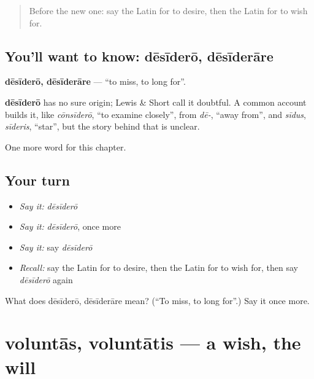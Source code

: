 \label{lesson:LA-C111-desidero}



\begin{quote}
Before the new one: say the Latin for to desire, then the Latin for to wish for.
\end{quote}

\subsection*{You'll want to know: dēsīderō, dēsīderāre}
\textbf{dēsīderō, dēsīderāre} — \textquotedblleft{}to miss, to long for\textquotedblright{}.

\begin{cousinweb}
\textbf{dēsīderō} has no sure origin; Lewis \& Short call it doubtful. A common account builds it, like \emph{cōnsīderō}, \textquotedblleft{}to examine closely\textquotedblright{}, from \emph{dē-}, \textquotedblleft{}away from\textquotedblright{}, and \emph{sīdus}, \emph{sīderis}, \textquotedblleft{}star\textquotedblright{}, but the story behind that is unclear.
\end{cousinweb}

\begin{grammarlens}[title={What you've built}]
One more word for this chapter.
\end{grammarlens}

\subsection*{Your turn}
\begin{itemize}
\raggedright
  \item \emph{Say it:} \emph{dēsīderō}
  \item \emph{Say it:} \emph{dēsīderō}, once more
  \item \emph{Say it:} say \emph{dēsīderō}
  \item \emph{Recall:} say the Latin for to desire, then the Latin for to wish for, then say \emph{dēsīderō} again
\end{itemize}

\begin{tcolorbox}[breakable,colback=teal!4,colframe=teal!35!black,title={Before you move on}]
What does dēsīderō, dēsīderāre mean? (\textquotedblleft{}To miss, to long for\textquotedblright{}.) Say it once more.
\end{tcolorbox}
\section[voluntās, voluntātis]{voluntās, voluntātis — a wish, the will}


